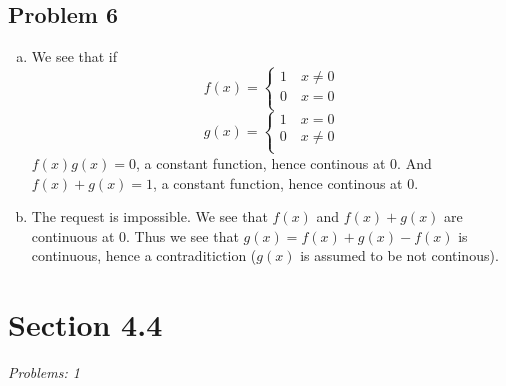 \documentclass[12pt]{article}
\begin{document}
\subsection*{Problem 6}
\begin{enumerate}[a).]
    \item {
        We see that if 
        $$
        f(x) = \left\{
            \begin{array}{ll}
                1 \quad x \ne 0 \\
                0 \quad x = 0\\
            \end{array} \right.
        $$
        $$
        g(x) = \left\{
            \begin{array}{ll}
                1 \quad x = 0 \\
                0 \quad x \ne 0\\
            \end{array} \right.
        $$
        $f(x)g(x) = 0$, a constant function, hence continous at $0$. 
        And $f(x) + g(x) = 1$, a constant function, hence continous at $0$. 
    }
    \item {
        The request is impossible. 
        We see that $f(x)$ and $f(x) + g(x)$ are continuous at 0. Thus we see that $g(x) = f(x) + g(x) - f(x)$ is continuous, hence a contraditiction ($g(x)$ is assumed to be not continous). 
    }
\end{enumerate}

\section*{Section 4.4}
\textit{Problems: 1}
\end{document}
